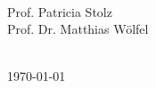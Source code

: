 \begin{titlepage}
\begin{minipage}{0.55\textwidth}
\begin{flushleft}
\end{flushleft}
\end{minipage}
~
\begin{minipage}{0.4\textwidth}
\begin{flushright} \large
Prof. Patricia Stolz\\
Prof. Dr. Matthias Wölfel\\ %
\end{flushright}
\end{minipage}\\[2cm]



{\large \today}\\[3cm] %


 

\vfill %

\end{titlepage}
\cleardoublepage
%